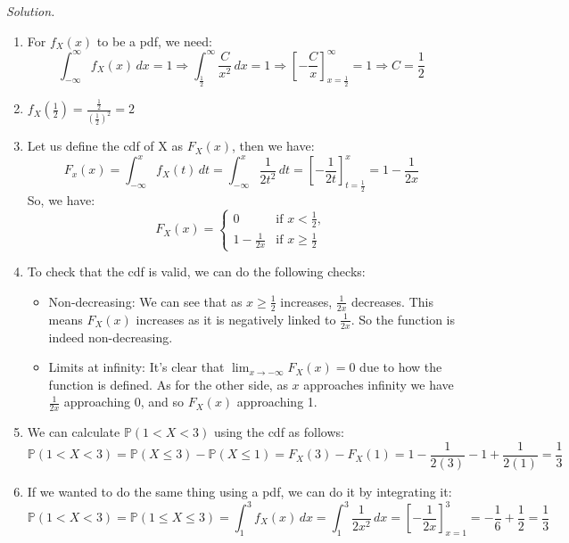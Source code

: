 \documentclass[11pt]{article}
\newenvironment{solution}{%
  \noindent\textit{Solution.}\quad
}{\par\bigskip}
\begin{document}
\begin{solution}
\begin{enumerate}
      \item For $f_{X}(x)$ to be a pdf, we need:
            \[
            \int_{-\infty}^{\infty} f_{X}(x)\,dx = 1
            \Rightarrow \int_{\frac{1}{2}}^{\infty} \frac{C}{x^2}\,dx = 1
            \Rightarrow \left[-\frac{C}{x}\right]_{x=\tfrac{1}{2}}^{\infty} = 1
            \Rightarrow C = \frac{1}{2}
            \]
      \item $f_{X}(\frac{1}{2}) = \frac{\frac{1}{2}}{(\frac{1}{2})^2} = 2$
      \item Let us define the cdf of X as $F_X(x)$, then we have:
            \[
            F_x(x) = \int_{-\infty}^{x} f_{X}(t)\,dt
            = \int_{-\infty}^{x} \frac{1}{2t^2}\,dt
            = \left[-\frac{1}{2t}\right]_{t=\frac{1}{2}}^{x}
            = 1 - \frac{1}{2x}
            \]
            So, we have:
            \[
            F_{X}(x) = 
            \begin{cases}
            0 & \text{if } x < \frac{1}{2}, \\
            1 - \frac{1}{2x}  & \text{if } x \ge \frac{1}{2}
            \end{cases}
            \]            
      \item To check that the cdf is valid, we can do the following checks:
            \begin{itemize}
            \item Non-decreasing: We can see that as $x \ge \frac{1}{2}$ increases, $\frac{1}{2x}$
                  decreases. This means $F_X(x)$ increases as it is negatively linked
                  to $\frac{1}{2x}$. So the function is indeed non-decreasing.
            \item Limits at infinity: It's clear that $\lim_{x \to -\infty}F_X(x)=0$ due to
                  how the function is defined. As for the other side, as $x$ approaches infinity
                  we have $\frac{1}{2x}$ approaching 0, and so $F_X(x)$ approaching 1.
            \end{itemize}
      \item We can calculate $\mathbb{P}(1<X<3)$ using the cdf as follows:
            \[
            \mathbb{P}(1<X<3) = \mathbb{P}(X \le 3) - \mathbb{P}(X \le 1)
            = F_X(3) - F_X(1) = 1 - \frac{1}{2(3)} - 1 + \frac{1}{2(1)} 
            = \frac{1}{3}
            \]
      \item If we wanted to do the same thing using a pdf, we can do it by integrating it:
            \[
            \mathbb{P}(1<X<3) = \mathbb{P}(1 \le X \le 3) 
            = \int_{1}^{3} f_{X}(x)\,dx = \int_{1}^{3} \frac{1}{2x^2}\,dx
            = \left[-\frac{1}{2x}\right]_{x=1}^{3}
            = -\frac{1}{6} + \frac{1}{2} = \frac{1}{3}
            \]
\end{enumerate}
\end{solution}
\end{document}
